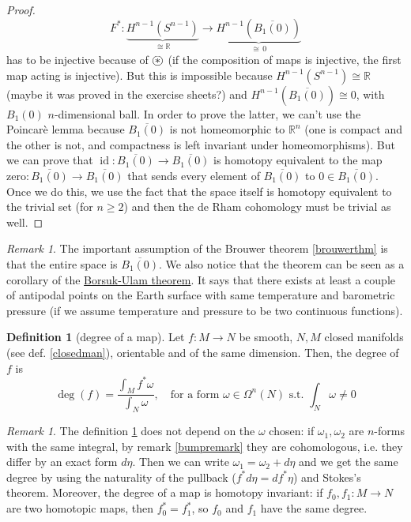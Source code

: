 \documentclass[a4paper,11pt,titlepage, article, oneside]{memoir}
\numberwithin{equation}{section}
\theoremstyle{definition}
\newtheorem{definition}[theorem]{Definition}
\theoremstyle{remark}
\newtheorem{remark}[theorem]{Remark}
\DeclareMathOperator{\id}{id}
\newcommand{\rfield}{\mathbb{R}}
\newcommand\oast{\stackMath\mathbin{\stackinset{c}{0ex}{c}{0ex}{\ast}{\bigcirc}}}
\begin{document}
\begin{proof}
$$F^* \colon \underbrace{H^{n-1}(S^{n-1})}_{\cong \rfield} \longrightarrow \underbrace{H^{n-1}(\overline{B_1(0)})}_{\cong \,0}$$
has to be injective because of $\oast$ (if the composition of maps is injective, the first map acting is injective). But this is impossible because $H^{n-1}(S^{n-1}) \cong \rfield$ (maybe it was proved in the exercise sheets?) and $H^{n-1}(\overline{B_1(0)}) \cong 0$, with $B_1(0)$ $n$-dimensional ball. In order to prove the latter, we can't use the Poincarè lemma because $\overline{B_1(0)}$ is not homeomorphic to $\rfield^n$ (one is compact and the other is not, and compactness is left invariant under homeomorphisms). But we can prove that $\id \colon \overline{B_1(0)} \rightarrow \overline{B_1(0)}$ is homotopy equivalent to the map $\text{zero} \colon \overline{B_1(0)} \rightarrow \overline{B_1(0)}$ that sends every element of $\overline{B_1(0)}$ to $0 \in \overline{B_1(0)}$. Once we do this, we use the fact that the space itself is homotopy equivalent to the trivial set (for $n \ge 2$) and then the de Rham cohomology must be trivial as well.
\end{proof}

\begin{remarkbox}\begin{remark}
The important assumption of the Brouwer theorem \ref{brouwerthm} is that the entire space is $\overline{B_1(0)}$. We also notice that the theorem can be seen as a corollary of the \href{https://en.wikipedia.org/wiki/Borsuk-Ulam_theorem}{Borsuk-Ulam theorem}. It says that there exists at least a couple of antipodal points on the Earth surface with same temperature and barometric pressure (if we assume temperature and pressure to be two continuous functions).
\end{remark}\end{remarkbox}

\begin{definition}[degree of a map] \label{degreemap}
Let $f \colon M \rightarrow  N$ be smooth, $N, M$ closed manifolds (see def.  \ref{closedman}), orientable and of the same dimension. Then, the degree of $f$ is
\begin{equation}
\deg(f) = \frac{\int_M f^* \omega}{\int_N \omega}, \quad \text{for a form } \omega \in \Omega^n(N) \text{ s.t. } \int_N\omega \not = 0
\end{equation}
\end{definition}

\begin{remarkbox}\begin{remark}
The definition \ref{degreemap} does not depend on the $\omega$ chosen: if $\omega_1, \omega_2$ are $n$-forms with the same integral, by remark \ref{bumpremark} they are cohomologous, i.e. they differ by an exact form $d\eta$. Then we can write $\omega_1 = \omega_2 + d\eta$ and we get the same degree by using the naturality of the pullback ($f^* d \eta = d f^* \eta$) and Stokes's theorem. Moreover, the degree of a map is homotopy invariant: if $f_0, f_1 \colon M \rightarrow N$ are two homotopic maps, then $f_0^* = f_1^*$, so $f_0$ and $f_1$ have the same degree.
\end{remark}\end{remarkbox}
\end{document}

